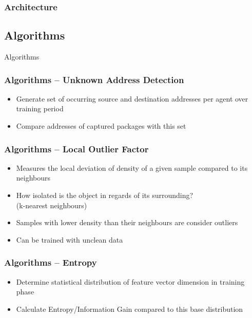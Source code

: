 \begin{frame}[c]
	\frametitle{Architecture}
	
	
	\note{
	}
\end{frame}

\subsection{Algorithms}
\begin{frame}[c]
	\centering
	\LARGE Algorithms
\end{frame}

\begin{frame}[c]
	\frametitle{Algorithms -- Unknown Address Detection}
	
	\begin{itemize}
		\item Generate set of occurring source and destination addresses per agent over training period
		\item Compare addresses of captured packages with this set
	\end{itemize}
\end{frame}

\begin{frame}[c]
	\frametitle{Algorithms -- Local Outlier Factor}
	
	\begin{itemize}
		\item Measures the local deviation of density of a given sample compared to its neighbours \parencite{Pedregosa2011}
		\item How isolated is the object in regards of its surrounding? \\ (k-nearest neighbours)
		\item Samples with lower density than their neighbours are consider outliers
		\item Can be trained with unclean data
	\end{itemize}
\end{frame}

\begin{frame}[c]
	\frametitle{Algorithms -- Entropy}
	
	\begin{itemize}
		\item Determine statistical distribution of feature vector dimension in training phase
		\item Calculate Entropy/Information Gain compared to this base distribution
	\end{itemize}
\end{frame}

